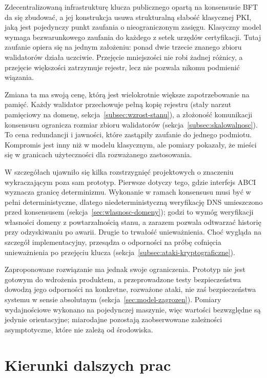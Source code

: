 Zdecentralizowaną infrastrukturę klucza publicznego opartą na konsensusie BFT da się zbudować, a jej konstrukcja usuwa strukturalną słabość klasycznej PKI, jaką jest pojedynczy punkt zaufania o nieograniczonym zasięgu. Klasyczny model wymaga bezwarunkowego zaufania do każdego z setek urzędów certyfikacji. Tutaj zaufanie opiera się na jednym założeniu: ponad dwie trzecie znanego zbioru walidatorów działa uczciwie. Przejęcie mniejszości nie robi żadnej różnicy, a przejęcie większości zatrzymuje rejestr, lecz nie pozwala nikomu podmienić wiązania.

Zmiana ta ma swoją cenę, którą jest wielokrotnie większe zapotrzebowanie na pamięć. Każdy walidator przechowuje pełną kopię rejestru (stały narzut pamięciowy na domenę, sekcja~\ref{subsec:wzrost-stanu}), a złożoność komunikacji konsensusu ogranicza rozmiar zbioru walidatorów (sekcja~\ref{subsec:skalowalnosc}). To cena redundancji i jawności, które zastąpiły zaufanie do jednego podmiotu. Kompromis jest inny niż w modelu klasycznym, ale pomiary pokazały, że mieści się w granicach użyteczności dla rozważanego zastosowania.

W szczegółach ujawniło się kilka rozstrzygnięć projektowych o znaczeniu wykraczającym poza sam prototyp. Pierwsze dotyczy tego, gdzie interfejs ABCI wyznacza granicę determinizmu. Wykonanie w ramach konsensusu musi być w pełni deterministyczne, dlatego niedeterministyczną weryfikację DNS umieszczono przed konsensusem (sekcja~\ref{sec:wlasnosc-domeny}); godzi to wymóg weryfikacji własności domeny z powtarzalnością stanu, a zarazem pozwala odtwarzać historię przy odzyskiwaniu po awarii. Drugie to trwałość unieważnienia. Choć wygląda na szczegół implementacyjny, przesądza o odporności na próbę cofnięcia unieważnienia po przejęciu klucza (sekcja~\ref{subsec:ataki-kryptograficzne}).

Zaproponowane rozwiązanie ma jednak swoje ograniczenia. Prototyp nie jest gotowym do wdrożenia produktem, a przeprowadzone testy bezpieczeństwa dowodzą jego odporności na konkretne, rozważone ataki, nie zaś bezpieczeństwa systemu w sensie absolutnym (sekcja~\ref{sec:model-zagrozen}). Pomiary wydajnościowe wykonano na pojedynczej maszynie, więc wartości bezwzględne są jedynie orientacyjne; miarodajne pozostają zaobserwowane zależności asymptotyczne, które nie zależą od środowiska.

\section{Kierunki dalszych prac}
\label{sec:dalsze-prace}

